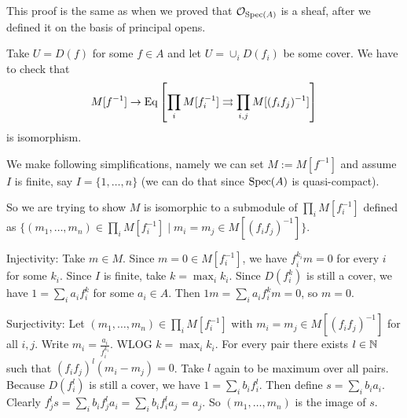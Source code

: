 \begin{exercise}{4}
    This proof is the same as when we proved that $\mathcal{O}_{\operatorname{Spec}(A)}$ is a
    sheaf, after we defined it on the basis of principal opens.

    Take $U = D(f)$ for some $f \in A$ and let $U = \cup_i D(f_i)$ be some
    cover. We have to check that 
    \begin{equation*}
        M[f^{-1}] \rightarrow \operatorname{Eq}\left[ \prod_i M[f^{-1}_i] \rightrightarrows
        \prod_{i, j} M[(f_i f_j)^{-1}]  \right]
    \end{equation*}
    is isomorphism.

    We make following simplifications, namely we can set $M := M[f^{-1}]$ and
    assume $I$ is finite, say $I = \{1, \dots, n\}$ (we can do that since
    $\operatorname{Spec}(A)$ is quasi-compact).

    So we are trying to show $M$ is isomorphic to a submodule of $\prod_i
    M[f^{-1}_i]$ defined as $\{ (m_1, \dots, m_n) \in \prod_i
    M[f^{-1}_i] \mid m_i = m_j \in M[(f_i f_j)^{-1}] \}$.

    Injectivity:
    Take $m \in M$. Since $m = 0 \in M[f^{-1}_i]$, we have $f^{k_i}_i m = 0$ for
    every $i$ for some $k_i$. Since $I$ is finite, take $k = \max_i k_i$.
    Since $D(f^k_i)$ is still a cover, we have $1 = \sum_i a_i f^k_i$ for some
    $a_i \in A$. Then $1m = \sum_i a_i f^k_i m = 0$, so $m = 0$.

    Surjectivity:
    Let $(m_1, \dots, m_n) \in \prod_i M[f^{-1}_i]$ with $m_i = m_j \in M[(f_i
    f_j)^{-1}]$ for all $i, j$. Write $m_i = \frac{a_i}{f^{k_i}_i}$. WLOG $k =
    \max_i k_i$. For every pair there exists $l \in \mathbb{N}$ such that $(f_i f_j)^l
    (m_i - m_j) = 0$. Take $l$ again to be maximum over all pairs. Because
    $D(f^l_i)$ is still a cover, we have $1 = \sum_i b_i f^l_i$. Then define $s
    = \sum_i b_i a_i$. Clearly $f^l_j s = \sum_i b_i f^l_j a_i =  \sum_i b_i
    f^l_i a_j = a_j$. So $(m_1, \dots, m_n)$ is the image of $s$.
\end{exercise}


